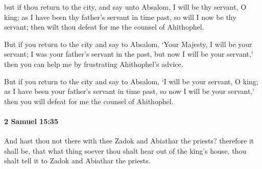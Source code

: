 			\begin{versebox}
					\item[BHS] 
					\item[ASV] but if thou return to the city, and say unto Absalom, I will be thy servant, O king; as I have been thy father's servant in time past, so will I now be thy servant; then wilt thou defeat for me the counsel of Ahithophel.
					\item[NIV] But if you return to the city and say to Absalom, ‘Your Majesty, I will be your servant; I was your father’s servant in the past, but now I will be your servant,’ then you can help me by frustrating Ahithophel’s advice.
					\item[NRSV] But if you return to the city and say to Absalom, ‘I will be your servant, O king; as I have been your father’s servant in time past, so now I will be your servant,’ then you will defeat for me the counsel of Ahithophel.
			\end{versebox}

		\paragraph{2 Samuel 15:35} %
			\label{2SAMUEL-15-35}

			And hast thou not there with thee Zadok and Abiathar the priests? therefore it shall be, that what thing soever thou shalt hear out of the king’s house, thou shalt tell it to Zadok and Abiathar the priests.

